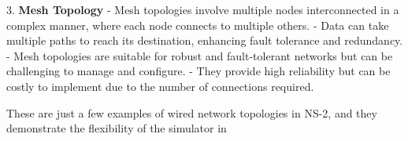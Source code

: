 \documentclass[11pt]{article}
\begin{document}
\begin{enumerate}
          3. \textbf{Mesh Topology}
          - Mesh topologies involve multiple nodes interconnected in a complex manner, where each node connects to multiple others.
          - Data can take multiple paths to reach its destination, enhancing fault tolerance and redundancy.
          - Mesh topologies are suitable for robust and fault-tolerant networks but can be challenging to manage and configure.
          - They provide high reliability but can be costly to implement due to the number of connections required.

          These are just a few examples of wired network topologies in NS-2, and they demonstrate the flexibility of the simulator in

\end{enumerate}
\end{document}
